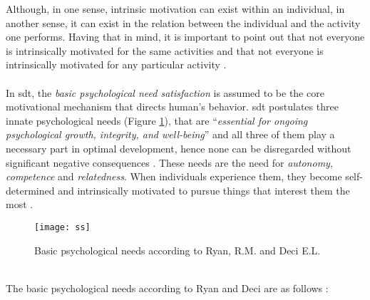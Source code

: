 Although, in one sense, intrinsic motivation can exist within an individual, in another sense, it can exist in the relation between the individual and the activity one performs. Having that in mind, it is important to point out that not everyone is intrinsically motivated for the same activities and that not everyone is intrinsically motivated for any particular activity \cite{ryan2000intrinsic}. \\\\In \acrshort{sdt}, the \textit{basic psychological need satisfaction} is assumed to be the core motivational mechanism that directs human's behavior. \acrshort{sdt} postulates three innate psychological needs (Figure \ref{fig:ss}), that are ``\textit{essential for ongoing psychological growth, integrity, and well-being}'' and all three of them play a necessary part in optimal development, hence none can be disregarded without significant negative consequences \cite{deci2000and}. These needs are the need for \textit{autonomy}, \textit{competence} and \textit{relatedness}. When individuals experience them, they become self-determined and intrinsically motivated to pursue things that interest them the most \cite{deci2000and}.
\begin{figure}[h]
    \centering
    \texttt{[image: ss]}
    \caption{Basic psychological needs according to Ryan, R.M. and Deci E.L. \cite{deci1994promoting} }
    \label{fig:ss}
\end{figure}\\
The basic psychological needs according to Ryan and Deci are as follows \cite{deci1994promoting}:
